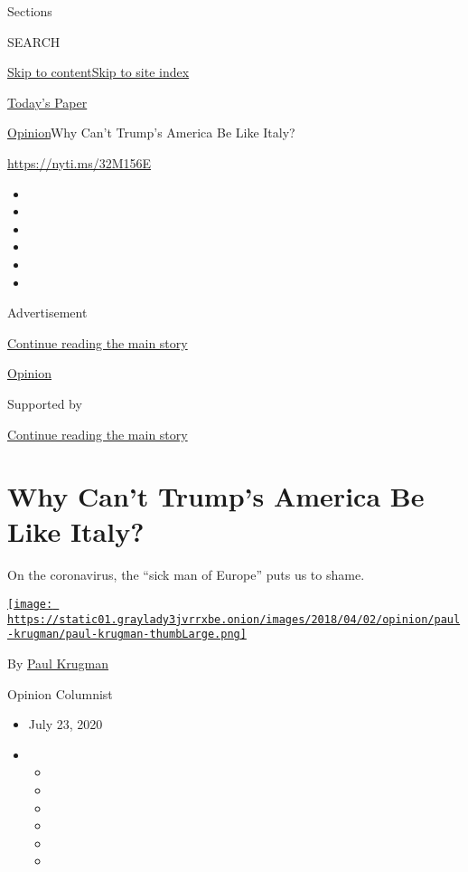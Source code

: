 Sections

SEARCH

\protect\hyperlink{site-content}{Skip to
content}\protect\hyperlink{site-index}{Skip to site index}

\href{https://myaccount.nytimes3xbfgragh.onion/auth/login?response_type=cookie\&client_id=vi}{}

\href{https://www.nytimes3xbfgragh.onion/section/todayspaper}{Today's
Paper}

\href{/section/opinion}{Opinion}\textbar{}Why Can't Trump's America Be
Like Italy?

\href{https://nyti.ms/32M156E}{https://nyti.ms/32M156E}

\begin{itemize}
\item
\item
\item
\item
\item
\item
\end{itemize}

Advertisement

\protect\hyperlink{after-top}{Continue reading the main story}

\href{/section/opinion}{Opinion}

Supported by

\protect\hyperlink{after-sponsor}{Continue reading the main story}

\hypertarget{why-cant-trumps-america-be-like-italy}{%
\section{Why Can't Trump's America Be Like
Italy?}\label{why-cant-trumps-america-be-like-italy}}

On the coronavirus, the ``sick man of Europe'' puts us to shame.

\href{https://www.nytimes3xbfgragh.onion/by/paul-krugman}{\texttt{[image: https://static01.graylady3jvrrxbe.onion/images/2018/04/02/opinion/paul-krugman/paul-krugman-thumbLarge.png]}}

By \href{https://www.nytimes3xbfgragh.onion/by/paul-krugman}{Paul
Krugman}

Opinion Columnist

\begin{itemize}
\item
  July 23, 2020
\item
  \begin{itemize}
  \item
  \item
  \item
  \item
  \item
  \item
  \end{itemize}
\end{itemize}

